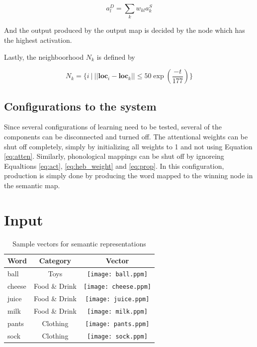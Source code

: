 \documentclass[a4paper,11pt]{article}
\begin{document}
\begin{equation}\label{eq:prop}
a_l^D = \sum_k w_{kl}a_k^S
\end{equation}

And the output produced by the output map is decided by the node which has the
highest activation.

Lastly, the neighboorhood $N_k$ is defined by

\begin{equation}\label{eq:neighboors}
N_k = \{ i \:| \:|| \textbf{loc$_i$} - \textbf{loc$_k$} || \leq 50\exp(\frac
{-t}{177})\}
\end{equation}

\subsection{Configurations to the system}

Since several configurations of learning need to be tested, several of the
components can be disconnected and turned off.  The attentional weights can be
shut off completely, simply by initializing all weights to 1 and not using
Equation \ref{eq:atten}.  Similarly, phonological mappings can be shut off by
ignoreing Equaltions \ref{eq:act}, \ref{eq:heb_weight} and \ref{eq:prop}.  In
this configuration, production is simply done by producing the word mapped to
the winning node in the semantic map.

\section{Input}

\begin{center}
  \begin{table}
    \begin{tabular}[t] { | l | c | c | }
      \hline
      Word & Category & Vector \\
      \hline
      ball & Toys & \texttt{[image: ball.ppm]} \\
      cheese & Food \& Drink & \texttt{[image: cheese.ppm]} \\
      juice & Food \& Drink &\texttt{[image: juice.ppm]} \\ 
      milk & Food \& Drink &\texttt{[image: milk.ppm]} \\ 
      pants & Clothing & \texttt{[image: pants.ppm]} \\
      sock & Clothing &\texttt{[image: sock.ppm]} \\
      \hline
    \end{tabular}
    \caption{Sample vectors for semantic representations}
    \label{tb:semantics}
  \end{table}
\end{center}
\end{document}
